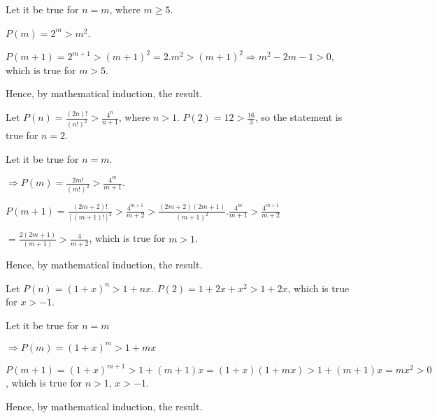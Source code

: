   Let it be true for $n = m$, where $m\geq 5$.

  $P(m) = 2^m > m^2$.

  $P(m + 1) = 2^{m + 1} > (m + 1)^2 = 2.m^2 > (m + 1)^2 \Rightarrow m^2 -2m - 1 > 0$, which is true for $m >
  5$.

  Hence, by mathematical induction, the result.
\item Let $P(n) = \frac{(2n)!}{(n!)^2} > \frac{4^n}{n + 1}$, where $n > 1$. $P(2) = 12 > \frac{16}{3}$, so
  the statement is true for $n = 2$.

  Let it be true for $n = m$.

  $\Rightarrow P(m) = \frac{2m!}{(m!)^2} > \frac{4^m}{m + 1}$.

  $P(m + 1) = \frac{(2m + 2)!}{[(m+ 1)!]^2} > \frac{4^{m + 1}}{m + 2} > \frac{(2m + 2)(2m + 1)}{(m +
    1)^2}.\frac{4^m}{m + 1} > \frac{4^{m + 1}}{m + 2}$

  $= \frac{2(2m + 1)}{(m + 1)} > \frac{4}{m + 2}$, which is true for $m > 1$.

  Hence, by mathematical induction, the result.
\item Let $P(n) = (1 + x)^n > 1 + nx$. $P(2) = 1 + 2x + x^2 > 1 + 2x$, which is true for $x > -1$.

  Let it be true for $n = m$

  $\Rightarrow P(m) = (1 + x)^m > 1 + mx$

  $P(m + 1) = (1 + x)^{m + 1}> 1 + (m + 1)x = (1 + x)(1 + mx) > 1 + (m + 1)x = mx^2 > 0$, which is true for
  $n > 1$, $x > -1$.

  Hence, by mathematical induction, the result.
\stopitemize
